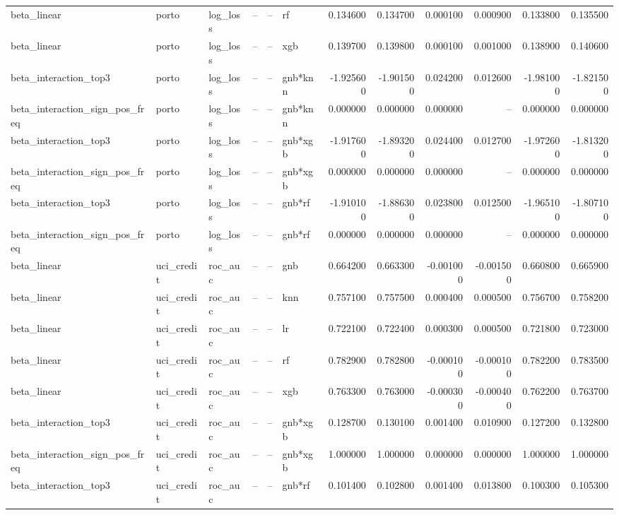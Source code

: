 \begin{landscape}
\begin{longtable}{llllllrrrrrr}
beta\_linear & porto & log\_loss & -- & -- & rf & 0.134600 & 0.134700 & 0.000100 & 0.000900 & 0.133800 & 0.135500 \\
beta\_linear & porto & log\_loss & -- & -- & xgb & 0.139700 & 0.139800 & 0.000100 & 0.001000 & 0.138900 & 0.140600 \\
beta\_interaction\_top3 & porto & log\_loss & -- & -- & gnb*knn & -1.925600 & -1.901500 & 0.024200 & 0.012600 & -1.981000 & -1.821500 \\
beta\_interaction\_sign\_pos\_freq & porto & log\_loss & -- & -- & gnb*knn & 0.000000 & 0.000000 & 0.000000 & -- & 0.000000 & 0.000000 \\
beta\_interaction\_top3 & porto & log\_loss & -- & -- & gnb*xgb & -1.917600 & -1.893200 & 0.024400 & 0.012700 & -1.972600 & -1.813200 \\
beta\_interaction\_sign\_pos\_freq & porto & log\_loss & -- & -- & gnb*xgb & 0.000000 & 0.000000 & 0.000000 & -- & 0.000000 & 0.000000 \\
beta\_interaction\_top3 & porto & log\_loss & -- & -- & gnb*rf & -1.910100 & -1.886300 & 0.023800 & 0.012500 & -1.965100 & -1.807100 \\
beta\_interaction\_sign\_pos\_freq & porto & log\_loss & -- & -- & gnb*rf & 0.000000 & 0.000000 & 0.000000 & -- & 0.000000 & 0.000000 \\
beta\_linear & uci\_credit & roc\_auc & -- & -- & gnb & 0.664200 & 0.663300 & -0.001000 & -0.001500 & 0.660800 & 0.665900 \\
beta\_linear & uci\_credit & roc\_auc & -- & -- & knn & 0.757100 & 0.757500 & 0.000400 & 0.000500 & 0.756700 & 0.758200 \\
beta\_linear & uci\_credit & roc\_auc & -- & -- & lr & 0.722100 & 0.722400 & 0.000300 & 0.000500 & 0.721800 & 0.723000 \\
beta\_linear & uci\_credit & roc\_auc & -- & -- & rf & 0.782900 & 0.782800 & -0.000100 & -0.000100 & 0.782200 & 0.783500 \\
beta\_linear & uci\_credit & roc\_auc & -- & -- & xgb & 0.763300 & 0.763000 & -0.000300 & -0.000400 & 0.762200 & 0.763700 \\
beta\_interaction\_top3 & uci\_credit & roc\_auc & -- & -- & gnb*xgb & 0.128700 & 0.130100 & 0.001400 & 0.010900 & 0.127200 & 0.132800 \\
beta\_interaction\_sign\_pos\_freq & uci\_credit & roc\_auc & -- & -- & gnb*xgb & 1.000000 & 1.000000 & 0.000000 & 0.000000 & 1.000000 & 1.000000 \\
beta\_interaction\_top3 & uci\_credit & roc\_auc & -- & -- & gnb*rf & 0.101400 & 0.102800 & 0.001400 & 0.013800 & 0.100300 & 0.105300 \\
\end{longtable}\endgroup

\end{landscape}

